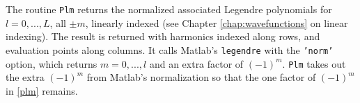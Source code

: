 The routine \texttt{Plm} returns the normalized associated Legendre polynomials for $l=0,...,L$, all $\pm m$, linearly indexed (see Chapter \ref{chap:wavefunctions} on linear indexing). The result is returned with harmonics indexed along rows, and evaluation points along columns. It calls Matlab's \texttt{legendre} with the \texttt{'norm'} option, which returns $m = 0,...,l$ and an extra factor of $(-1)^m$. \texttt{Plm} takes out the extra $(-1)^m$ from Matlab's normalization so that the one factor of $(-1)^m$ in \eqref{plm} remains. %

{\footnotesize
{}
}




